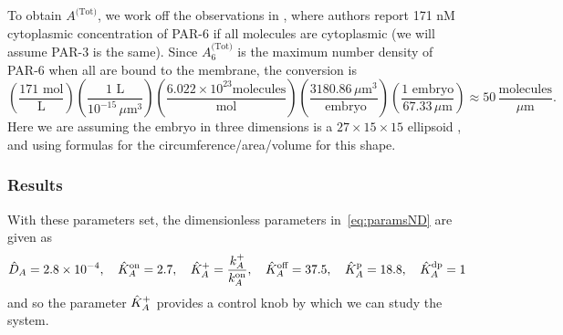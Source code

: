 \documentclass[11pt]{article}
\newcommand{\6}[1]{#1_{\text{6}}}
\newcommand{\3}[1]{#1_{\text{3}}}
\newcommand{\Tot}[1]{#1^\text{(Tot)}}
\newcommand{\A}[1]{#1_A}
\begin{document}
\begin{table}
\begin{small}
\caption{\label{tab:params} Parameter values for PAR-3 and PAR-2 model. }
\end{small}
\end{table}

To obtain $\Tot{A}$, we work off the observations in \cite{goehring2011polarization}, where authors report 171 nM cytoplasmic concentration of PAR-6 if all molecules are cytoplasmic (we will assume PAR-3 is the same). Since $\Tot{\6{A}}$ is the maximum number density of PAR-6 when all are bound to the membrane, the conversion is 
\begin{equation*}
\left(\frac{171 \text{ mol}}{\text{L}}\right)\left(\frac{1 \text{ L}}{10^{-15} \, \mu \text{m}^3}\right)\left(\frac{6.022 \times 10^{23} \text{molecules}}{\text{mol}}\right)\left(\frac{3180.86 \, \mu \text{m}^3}{\text{ embryo}}\right)\left(\frac{1 \text{ embryo}} {67.33 \, \mu \text{m}}\right) \approx 50 \, \frac{\text{molecules}}{\mu \text{m}}.
\end{equation*}
Here we are assuming the embryo in three dimensions is a $27 \times 15 \times 15$ ellipsoid \cite{goehring2011polarization}, and using formulas for the circumference/area/volume for this shape.

\subsubsection{Results}
With these parameters set, the dimensionless parameters in\ \eqref{eq:paramsND} are given as
\begin{gather*}
\DhatA =2.8 \times 10^{-4}, \quad \KhatonA=2.7, \quad \KhatfA = \frac{\A{\kf}}{\A{\kon}}, \quad  \KhatoffA = 37.5, \quad \KhatpA = 18.8, \quad \KhatdpA=1
\end{gather*}
and so the parameter $\hat{K}^\text{+}_A$ provides a control knob by which we can study the system.
\end{document}
